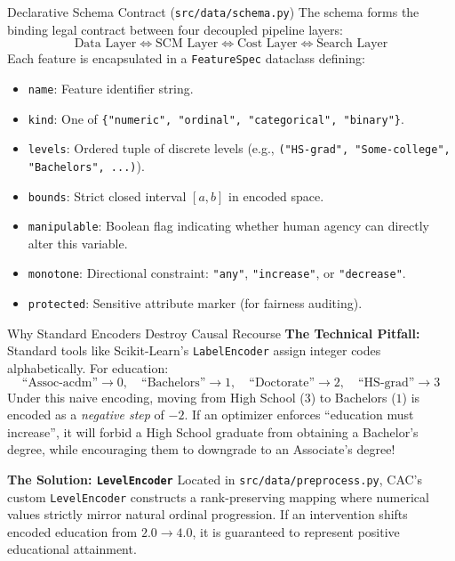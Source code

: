 \documentclass[11pt,a4paper]{article}
\begin{document}
\begin{parentconcept}{Declarative Schema Contract (\texttt{src/data/schema.py})}
The schema forms the binding legal contract between four decoupled pipeline layers:
\begin{equation}
\text{Data Layer} \iff \text{SCM Layer} \iff \text{Cost Layer} \iff \text{Search Layer}
\end{equation}
Each feature is encapsulated in a \texttt{FeatureSpec} dataclass defining:
\begin{itemize}[leftmargin=1.5em]
    \item \texttt{name}: Feature identifier string.
    \item \texttt{kind}: One of \texttt{\{"numeric", "ordinal", "categorical", "binary"\}}.
    \item \texttt{levels}: Ordered tuple of discrete levels (e.g., \texttt{("HS-grad", "Some-college", "Bachelors", ...)}).
    \item \texttt{bounds}: Strict closed interval $[a, b]$ in encoded space.
    \item \texttt{manipulable}: Boolean flag indicating whether human agency can directly alter this variable.
    \item \texttt{monotone}: Directional constraint: \texttt{"any"}, \texttt{"increase"}, or \texttt{"decrease"}.
    \item \texttt{protected}: Sensitive attribute marker (for fairness auditing).
\end{itemize}
\end{parentconcept}

\begin{childbranch}{Why Standard Encoders Destroy Causal Recourse}
\textbf{The Technical Pitfall:}
Standard tools like Scikit-Learn's \texttt{LabelEncoder} assign integer codes alphabetically. For education:
\begin{equation}
\text{``Assoc-acdm''} \to 0, \quad \text{``Bachelors''} \to 1, \quad \text{``Doctorate''} \to 2, \quad \text{``HS-grad''} \to 3
\end{equation}
Under this naive encoding, moving from High School ($3$) to Bachelors ($1$) is encoded as a \emph{negative step} of $-2$. If an optimizer enforces ``education must increase'', it will forbid a High School graduate from obtaining a Bachelor's degree, while encouraging them to downgrade to an Associate's degree!

\medskip\noindent
\textbf{The Solution: \texttt{LevelEncoder}}
Located in \texttt{src/data/preprocess.py}, CAC's custom \texttt{LevelEncoder} constructs a rank-preserving mapping where numerical values strictly mirror natural ordinal progression. If an intervention shifts encoded education from $2.0 \to 4.0$, it is guaranteed to represent positive educational attainment.
\end{childbranch}
\end{document}
